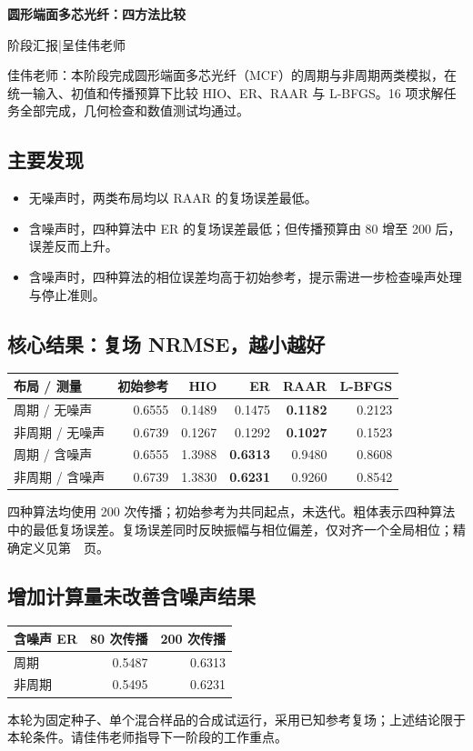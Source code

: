 \documentclass[UTF8,a4paper,11pt,fontset=fandol]{ctexart}
\begin{document}
\begin{center}
{\LARGE\bfseries\color{ink}圆形端面多芯光纤：四方法比较}\par
\vspace{3pt}阶段汇报\enspace |\enspace 呈佳伟老师
\end{center}
佳伟老师：本阶段完成圆形端面多芯光纤（MCF）的周期与非周期两类模拟，在统一输入、初值和传播预算下比较 HIO、ER、RAAR 与 L-BFGS。16 项求解任务全部完成，几何检查和数值测试均通过。
\subsection*{主要发现}
\begin{itemize}
\item 无噪声时，两类布局均以 RAAR 的复场误差最低。
\item 含噪声时，四种算法中 ER 的复场误差最低；但传播预算由 80 增至 200 后，误差反而上升。
\item 含噪声时，四种算法的相位误差均高于初始参考，提示需进一步检查噪声处理与停止准则。
\end{itemize}
\subsection*{核心结果：复场 NRMSE，越小越好}
\begin{center}\small
\begin{tabular}{lrrrrr}\toprule
布局 / 测量 & 初始参考 & HIO & ER & RAAR & L-BFGS\\\midrule
周期 / 无噪声 & 0.6555 & 0.1489 & 0.1475 & \textbf{0.1182} & 0.2123\\
非周期 / 无噪声 & 0.6739 & 0.1267 & 0.1292 & \textbf{0.1027} & 0.1523\\
周期 / 含噪声 & 0.6555 & 1.3988 & \textbf{0.6313} & 0.9480 & 0.8608\\
非周期 / 含噪声 & 0.6739 & 1.3830 & \textbf{0.6231} & 0.9260 & 0.8542\\\bottomrule
\end{tabular}\end{center}
四种算法均使用 200 次传播；初始参考为共同起点，未迭代。粗体表示四种算法中的最低复场误差。复场误差同时反映振幅与相位偏差，仅对齐一个全局相位；精确定义见第~\pageref{sec:metrics}~页。
\subsection*{增加计算量未改善含噪声结果}
\begin{center}
\begin{tabular}{lrr}\toprule
含噪声 ER & 80 次传播 & 200 次传播\\\midrule
周期 & 0.5487 & 0.6313\\
非周期 & 0.5495 & 0.6231\\\bottomrule
\end{tabular}\end{center}
本轮为固定种子、单个混合样品的合成试运行，采用已知参考复场；上述结论限于本轮条件。请佳伟老师指导下一阶段的工作重点。
\end{document}
